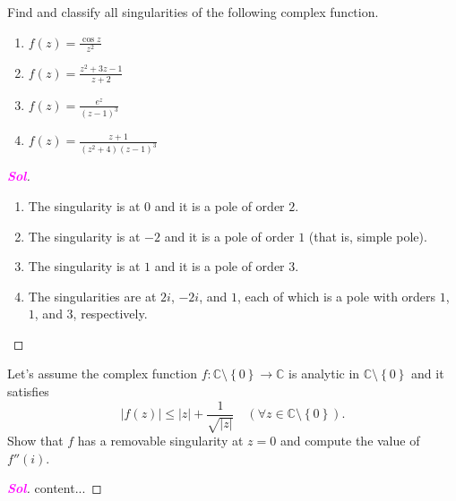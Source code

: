 \documentclass{article}
\theoremstyle{definition}
\newcommand{\set}[1]{\left\{#1\right\}}
\newcommand{\C}{\mathbb{C}}
\newcommand{\abs}[1]{\left\lvert #1 \right\rvert}
\newcommand{\sol}{\textcolor{magenta}{\bf Sol}}
\begin{document}
	\vspace{8pt}
	\begin{tcolorbox}[colback=white,colframe=white,arc=5pt,title={\color{black}\bf $\bullet$ Classification of Singularities II}]
		Find and classify all singularities of the following complex function.
		\begin{enumerate}[(1)]
			\item $\displaystyle f(z)=\frac{\cos z}{z^2}$
			\item $\displaystyle f(z)=\frac{z^2+3z-1}{z+2}$
			\item $\displaystyle f(z)=\frac{e^z}{(z-1)^3}$
			\item $\displaystyle f(z)=\frac{z+1}{(z^2+4)(z-1)^3}$
		\end{enumerate}
	\end{tcolorbox}
	\begin{proof}[\sol]
		\begin{enumerate}[(1)]
			\item The singularity is at $0$ and it is a pole of order $2$.
			\item The singularity is at $-2$ and it is a pole of order $1$ (that is, simple pole).
			\item The singularity is at $1$ and it is a pole of order $3$.
			\item The singularities are at $2i$, $-2i$, and $1$, each of which is a pole with orders $1$, $1$, and $3$, respectively.
		\end{enumerate}
	\end{proof}
	\vspace{8pt}
	\begin{tcolorbox}[colback=white,colframe=white,arc=5pt,title={\color{black}\bf \textcolor{red}{$\star$} Classification of Singularities III}]
		Let's assume the complex function $f:\C\setminus\set{0}\to\C$ is analytic in $\C\setminus\set{0}$ and it satisfies \[
		\abs{f(z)}\leq\abs{z}+\frac{1}{\sqrt{\abs{z}}}\quad(\forall z\in\C\setminus\set{0}).
		\] Show that $f$ has a removable singularity at $z=0$ and compute the value of $f''(i)$.
	\end{tcolorbox}
	\begin{proof}[\sol]
		content...
	\end{proof}
	
	\begin{tcolorbox}[colback=white,colframe=white,arc=5pt,title={\color{black}\bf $\bullet$ Series Expansion of a Complex Function III}]
		
	\end{tcolorbox}
	
\end{document}
